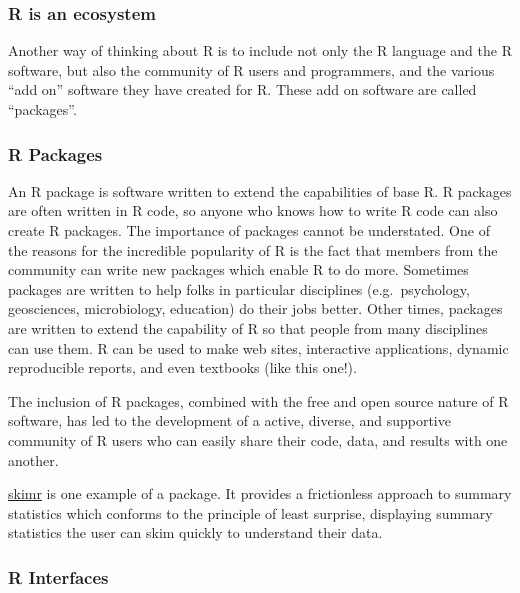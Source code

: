 \documentclass[
]{article}
\newenvironment{bonus}{
  \specialblock{bonus}{sun-fill.png}{Bonus}
}{\endspecialblock}
\begin{document}
\hypertarget{r-is-an-ecosystem}{%
\subsubsection{R is an ecosystem}\label{r-is-an-ecosystem}}

Another way of thinking about R is to include not only the R language and the R software, but also the community of R users and programmers, and the various ``add on'' software they have created for R.
These add on software are called ``packages''.

\hypertarget{r-packages}{%
\subsubsection{R Packages}\label{r-packages}}

An R package is software written to extend the capabilities of base R.
R packages are often written in R code, so anyone who knows how to write R code can also create R packages.
The importance of packages cannot be understated.
One of the reasons for the incredible popularity of R is the fact that members from the community can write new packages which enable R to do more.
Sometimes packages are written to help folks in particular disciplines (e.g.~psychology, geosciences, microbiology, education) do their jobs better.
Other times, packages are written to extend the capability of R so that people from many disciplines can use them.
R can be used to make web sites, interactive applications, dynamic reproducible reports, and even textbooks (like this one!).

The inclusion of R packages, combined with the free and open source nature of R software, has led to the development of a active, diverse, and supportive community of R users who can easily share their code, data, and results with one another.

\begin{bonus}
\href{https://github.com/ropensci/skimr}{skimr} is one example of a
package. It provides a frictionless approach to summary statistics which
conforms to the principle of least surprise, displaying summary
statistics the user can skim quickly to understand their data.
\end{bonus}

\hypertarget{r-interfaces}{%
\subsubsection{R Interfaces}\label{r-interfaces}}
\end{document}
